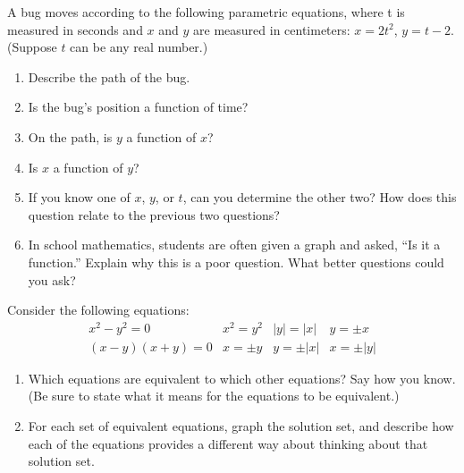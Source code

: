 \begin{prob}
A bug moves according to the following parametric equations, where t is measured in seconds and $x$ and $y$ are measured in centimeters:  $x = 2t^2$, $y = t-2$.  (Suppose $t$ can be any real number.)   
\begin{enumerate}
\item Describe the path of the bug.  
\item Is the bug's position a function of time?  
\item On the path, is $y$ a function of $x$?  
\item Is $x$ a function of $y$?  
\item If you know one of $x$, $y$, or $t$, can you determine the other two?  How does this question relate to the previous two questions?  
\item In school mathematics, students are often given a graph and asked, ``Is it a function.''  Explain why this is a poor question.  What better questions could you ask?  
\end{enumerate}
\end{prob}

\begin{prob}
Consider the following equations:  
\setlength{\arraycolsep}{12pt}
\setlength{\extrarowheight}{3pt}
\[
\begin{array}{cccc}
x^2-y^2=0    &   x^2=y^2   &   |y|=|x|   &   y= \pm x \\
(x-y)(x+y)=0  &   x= \pm y   &   y = \pm|x|   & x = \pm|y|
\end{array}
\]
\begin{enumerate}
\item Which equations are equivalent to which other equations?  Say how you know.  (Be sure to state what it means for the equations to be equivalent.)
\item For each set of equivalent equations, graph the solution set, and describe how each of the equations provides a different way about thinking about that solution set.  
\end{enumerate}
\end{prob}

